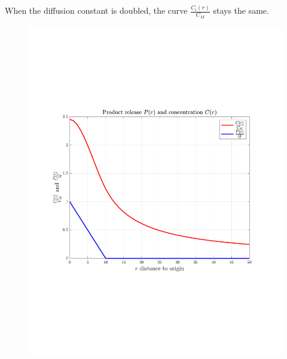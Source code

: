 \documentclass[12pt,twoside]{article}
\begin{document}
When the diffusion constant is doubled, the curve $\frac{C_i(r)}{C_M}$ stays the same.

\begin{figure}[H]
 \centering
 \includegraphics[scale=0.5]{concentration}
\end{figure}

\ee
\end{document}
